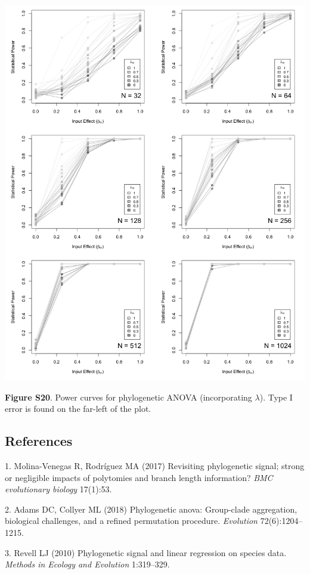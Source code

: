 \documentclass[
]{article}
\begin{document}
\includegraphics[width=0.95\linewidth]{fig.S20}

\textbf{Figure S20}. Power curves for phylogenetic ANOVA (incorporating
\(\lambda\)). Type I error is found on the far-left of the plot.

\newpage

\hypertarget{references}{%
\subsection*{References}\label{references}}

\hypertarget{refs}{}
\leavevmode\hypertarget{ref-MolinaVenegas2017}{}%
1. Molina-Venegas R, Rodríguez MA (2017) Revisiting phylogenetic signal;
strong or negligible impacts of polytomies and branch length
information? \emph{BMC evolutionary biology} 17(1):53.

\leavevmode\hypertarget{ref-AdamsCollyer2018b}{}%
2. Adams DC, Collyer ML (2018) Phylogenetic anova: Group-clade
aggregation, biological challenges, and a refined permutation procedure.
\emph{Evolution} 72(6):1204--1215.

\leavevmode\hypertarget{ref-Revell2010}{}%
3. Revell LJ (2010) Phylogenetic signal and linear regression on species
data. \emph{Methods in Ecology and Evolution} 1:319--329.
\end{document}
